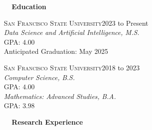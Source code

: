 \documentclass[hidelinks, 10.5pt]{article}
\newcommand{\contentwidth}{0.9\linewidth}
\newcommand{\contentspacing}{2.5mm}
\newcommand{\sectionspacing}{8mm}
\newcommand{\sectiontocontentspacing}{4mm}
\begin{document}
{\centering
\vspace{\contentspacing}

{\fontsize{14}{14}\selectfont \textbf{\ \ Education\ \ }}\hrulefill

\vspace{\sectiontocontentspacing}

\begin{minipage}[ct]{\contentwidth}
    {\textsc{San Francisco State University}}\hfill 2023 to Present\\
    \emph{Data Science and Artificial Intelligence, M.S.}\\
    GPA: $4.00$\\
    Anticipated Graduation: May 2025
\end{minipage}

\vspace{\contentspacing}

\begin{minipage}[ct]{\contentwidth}
    {\textsc{San Francisco State University}}\hfill 2018 to 2023\\
    \emph{Computer Science, B.S.}\\
    GPA: $4.00$\\
    \emph{Mathematics: Advanced Studies, B.A.}\\
    GPA: $3.98$
\end{minipage}



\vspace{\sectionspacing}
{\centering


    {\fontsize{14}{14}\selectfont \textbf{\ \ Research Experience\ \ }}\hrulefill

    \vspace{\sectiontocontentspacing}

}}
\end{document}
